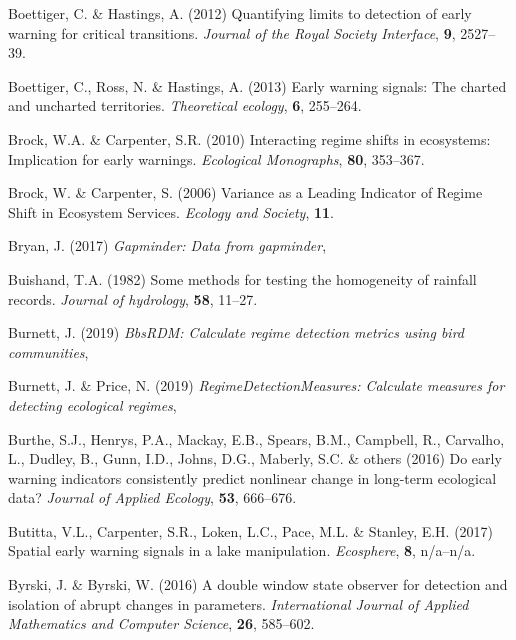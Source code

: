 \documentclass[print]{nuthesis}
\begin{document}
\leavevmode\hypertarget{ref-boettiger_quantifying_2012}{}%
Boettiger, C. \& Hastings, A. (2012) Quantifying limits to detection of early warning for critical transitions. \emph{Journal of the Royal Society Interface}, \textbf{9}, 2527--39.

\leavevmode\hypertarget{ref-boettiger_early_2013}{}%
Boettiger, C., Ross, N. \& Hastings, A. (2013) Early warning signals: The charted and uncharted territories. \emph{Theoretical ecology}, \textbf{6}, 255--264.

\leavevmode\hypertarget{ref-brock2010interacting}{}%
Brock, W.A. \& Carpenter, S.R. (2010) Interacting regime shifts in ecosystems: Implication for early warnings. \emph{Ecological Monographs}, \textbf{80}, 353--367.

\leavevmode\hypertarget{ref-brock_variance_2006}{}%
Brock, W. \& Carpenter, S. (2006) Variance as a Leading Indicator of Regime Shift in Ecosystem Services. \emph{Ecology and Society}, \textbf{11}.

\leavevmode\hypertarget{ref-gapminder}{}%
Bryan, J. (2017) \emph{Gapminder: Data from gapminder},

\leavevmode\hypertarget{ref-buishand1982some}{}%
Buishand, T.A. (1982) Some methods for testing the homogeneity of rainfall records. \emph{Journal of hydrology}, \textbf{58}, 11--27.

\leavevmode\hypertarget{ref-bbsRDM}{}%
Burnett, J. (2019) \emph{BbsRDM: Calculate regime detection metrics using bird communities},

\leavevmode\hypertarget{ref-regimeDetectionMeasures}{}%
Burnett, J. \& Price, N. (2019) \emph{RegimeDetectionMeasures: Calculate measures for detecting ecological regimes},

\leavevmode\hypertarget{ref-burthe2016early}{}%
Burthe, S.J., Henrys, P.A., Mackay, E.B., Spears, B.M., Campbell, R., Carvalho, L., Dudley, B., Gunn, I.D., Johns, D.G., Maberly, S.C. \& others (2016) Do early warning indicators consistently predict nonlinear change in long-term ecological data? \emph{Journal of Applied Ecology}, \textbf{53}, 666--676.

\leavevmode\hypertarget{ref-butitta_spatial_2017}{}%
Butitta, V.L., Carpenter, S.R., Loken, L.C., Pace, M.L. \& Stanley, E.H. (2017) Spatial early warning signals in a lake manipulation. \emph{Ecosphere}, \textbf{8}, n/a--n/a.

\leavevmode\hypertarget{ref-byrski2016double}{}%
Byrski, J. \& Byrski, W. (2016) A double window state observer for detection and isolation of abrupt changes in parameters. \emph{International Journal of Applied Mathematics and Computer Science}, \textbf{26}, 585--602.
\end{document}
